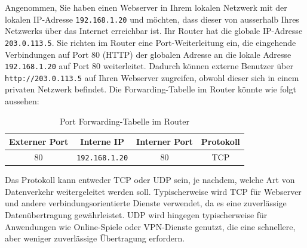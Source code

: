 \begin{myexample}
Angenommen, Sie haben einen Webserver in Ihrem lokalen Netzwerk mit der lokalen \gls{IP}-Adresse \texttt{192.168.1.20} und möchten, dass dieser von ausserhalb Ihres Netzwerks über das Internet erreichbar ist. Ihr Router hat die globale \gls{IP}-Adresse \texttt{203.0.113.5}. Sie richten im Router eine Port-Weiterleitung ein, die eingehende Verbindungen auf Port 80 (\gls{HTTP}) der globalen Adresse an die lokale Adresse \texttt{192.168.1.20} auf Port 80 weiterleitet. Dadurch können externe Benutzer über \texttt{http://203.0.113.5} auf Ihren Webserver zugreifen, obwohl dieser sich in einem privaten Netzwerk befindet. Die Forwarding-Tabelle im Router könnte wie folgt aussehen:
\begin{table}[H]
	\centering
	\begin{tabular}{cccc}
		\textbf{Externer Port} & \textbf{Interne \acrshort{IP}} & \textbf{Interner Port} & \textbf{Protokoll} \\
		\midrule
		80 & \texttt{192.168.1.20} & 80 & \gls{TCP} \\
	\end{tabular}
	\caption{Port Forwarding-Tabelle im Router}
\end{table}

Das Protokoll kann entweder \gls{TCP} oder \gls{UDP} sein, je nachdem, welche Art von Datenverkehr weitergeleitet werden soll. Typischerweise wird \gls{TCP} für Webserver und andere verbindungsorientierte Dienste verwendet, da es eine zuverlässige Datenübertragung gewährleistet. \gls{UDP} wird hingegen typischerweise für Anwendungen wie Online-Spiele oder \gls{VPN}-Dienste genutzt, die eine schnellere, aber weniger zuverlässige Übertragung erfordern.
\end{myexample}

